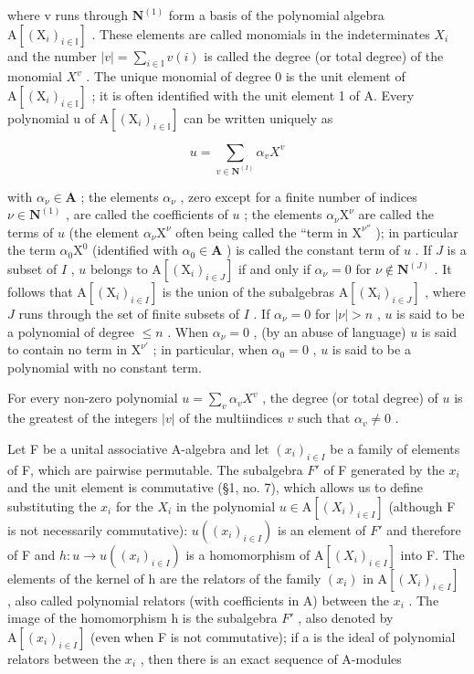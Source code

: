 where v runs through \(\mathbf{N}^{(1)}\) form a basis of the polynomial algebra \(\mathrm{A}[(\mathrm{X}_{i})_{i\in\mathbb{I}}]\) . These elements are called monomials in the indeterminates \(X_{i}\) and the number \(|v|=\sum_{i\in\mathbb{I}}v(i)\) is called the degree (or total degree) of the monomial \(X^{v}\) . The unique monomial of degree 0 is the unit element of \(\mathrm{A}[(\mathrm{X}_{i})_{i\in\mathbb{I}}]\) ; it is often identified with the unit element 1 of A. Every polynomial u of \(\mathrm{A}[(\mathrm{X}_{i})_{i\in\mathbb{I}}]\) can be written uniquely as

\[
u = \sum_ {v \in \mathbf {N} ^ {(I)}} \alpha_ {v} X ^ {v}
\]

with \(\alpha_{\nu} \in \mathbf{A}\) ; the elements \(\alpha_{\nu}\) , zero except for a finite number of indices \(\nu \in \mathbf{N}^{(1)}\) , are called the coefficients of \(u\) ; the elements \(\alpha_{\nu} \mathrm{X}^{\nu}\) are called the terms of \(u\) (the element \(\alpha_{\nu} \mathrm{X}^{\nu}\) often being called the ``term in \(\mathrm{X}^{\nu''}\) ); in particular the term \(\alpha_{0} \mathrm{X}^{0}\) (identified with \(\alpha_{0} \in \mathbf{A}\) ) is called the constant term of \(u\) . If \(J\) is a subset of \(I\) , \(u\) belongs to \(\mathrm{A}[(\mathrm{X}_{i})_{i \in J}]\) if and only if \(\alpha_{\nu} = 0\) for \(\nu \notin \mathbf{N}^{(J)}\) . It follows that \(\mathrm{A}[(\mathrm{X}_{i})_{i \in I}]\) is the union of the subalgebras \(\mathrm{A}[(\mathrm{X}_{i})_{i \in J}]\) , where \(J\) runs through the set of finite subsets of \(I\) . If \(\alpha_{\nu} = 0\) for \(|\nu| > n\) , \(u\) is said to be a polynomial of degree \(\leqslant n\) . When \(\alpha_{\nu} = 0\) , (by an abuse of language) \(u\) is said to contain no term in \(\mathrm{X}^{\nu'}\) ; in particular, when \(\alpha_{0} = 0\) , \(u\) is said to be a polynomial with no constant term.

For every non-zero polynomial \(u = \sum_{v} \alpha_v X^v\) , the degree (or total degree) of \(u\) is the greatest of the integers \(|v|\) of the multiindices \(v\) such that \(\alpha_v \neq 0\) .

Let F be a unital associative A-algebra and let \((x_{i})_{i\in I}\) be a family of elements of F, which are pairwise permutable. The subalgebra \(F'\) of F generated by the \(x_{i}\) and the unit element is commutative (§1, no. 7), which allows us to define substituting the \(x_{i}\) for the \(X_{i}\) in the polynomial \(u\in\mathrm{A}[(X_{i})_{i\in I}]\) (although F is not necessarily commutative): \(u((x_{i})_{i\in I})\) is an element of \(F'\) and therefore of F and \(h\colon u\to u((x_{i})_{i\in I})\) is a homomorphism of \(\mathrm{A}[(X_{i})_{i\in I}]\) into F. The elements of the kernel of h are the relators of the family \((x_{i})\) in \(\mathrm{A}[(X_{i})_{i\in I}]\) , also called polynomial relators (with coefficients in A) between the \(x_{i}\) . The image of the homomorphism h is the subalgebra \(F'\) , also denoted by \(\mathrm{A}[(x_{i})_{i\in I}]\) (even when F is not commutative); if a is the ideal of polynomial relators between the \(x_{i}\) , then there is an exact sequence of A-modules

